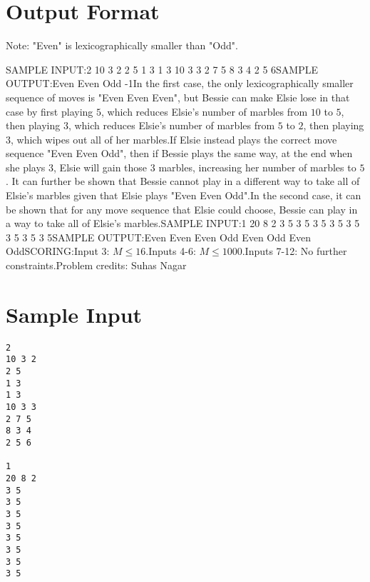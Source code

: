 \documentclass[12pt]{article}
\begin{document}
\section*{Output Format}
Note: "Even" is lexicographically smaller than "Odd".

SAMPLE INPUT:2
10 3 2
2 5
1 3
1 3
10 3 3
2 7 5
8 3 4
2 5 6SAMPLE OUTPUT:Even Even Odd
-1In the first case, the only lexicographically smaller sequence of moves is "Even
Even Even", but Bessie can make Elsie lose in that case by first playing $5$,
which reduces Elsie's number of marbles from $10$ to $5$, then playing $3$, which
reduces Elsie's number of marbles from $5$ to $2$, then playing $3$, which wipes out
all of her marbles.If Elsie instead plays the correct move sequence "Even Even Odd", then if Bessie
plays the same way, at the end when she plays $3$, Elsie will gain those $3$
marbles, increasing her number of marbles to $5$. It can further be shown that
Bessie cannot play in a different way to take all of Elsie's marbles given that
Elsie plays "Even Even Odd".In the second case, it can be shown that for any move sequence that Elsie could
choose, Bessie can play in a way to take all of Elsie's marbles.SAMPLE INPUT:1
20 8 2
3 5
3 5
3 5
3 5
3 5
3 5
3 5
3 5SAMPLE OUTPUT:Even Even Even Odd Even Odd Even OddSCORING:Input 3: $M \leq 16$.Inputs 4-6: $M \leq 1000$.Inputs
7-12: No further constraints.Problem credits: Suhas Nagar

\section*{Sample Input}
\begin{verbatim}
2
10 3 2
2 5
1 3
1 3
10 3 3
2 7 5
8 3 4
2 5 6

1
20 8 2
3 5
3 5
3 5
3 5
3 5
3 5
3 5
3 5
\end{verbatim}
\end{document}
